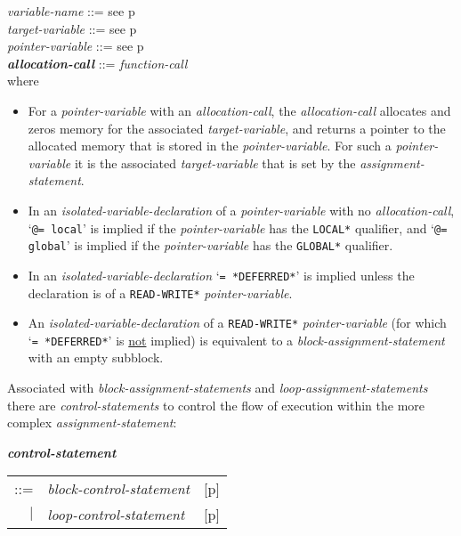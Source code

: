 \documentclass[12pt]{article}
\newcommand{\emkey}[1]{{\em \bfseries #1}}
\newcommand{\pagref}[1]{p\pageref{#1}}
\newenvironment{indpar}[1][0.3in]%
	{\begin{list}{}%
		     {\setlength{\itemsep}{0in}%
		      \setlength{\topsep}{0in}%
		      \setlength{\parsep}{1ex}%
		      \setlength{\labelwidth}{#1}%
		      \setlength{\leftmargin}{#1}%
		      \addtolength{\leftmargin}{\labelsep}}%
	 \item}%
	{\end{list}}
\begin{document}
\begin{indpar}
{\em variable-name} ::= see \pagref{VARIABLE-NAME}
\\[0.5ex]
{\em target-variable} ::= see \pagref{TARGET-VARIABLE}
\\[0.5ex]
{\em pointer-variable} ::= see \pagref{POINTER-VARIABLE}
\\[0.5ex]
\emkey{allocation-call}\label{ALLOCATION-CALL} ::= {\em function-call}
\\[2ex]
where
\begin{itemize}
\item For a {\em pointer-variable} with an {\em allocation-call},
the {\em allocation-call} allocates and zeros memory for the
associated {\em target-variable}, and returns a pointer to the
allocated memory that is stored in the {\em pointer-variable}.
For such a {\em pointer-variable} it is the
associated {\em target-variable} that is set by the {\em assignment-statement}.
\item In an {\em isolated-variable-declaration} of a
{\em pointer-variable} with no {\em allocation-call},
`{\tt @= local}' is implied if the {\em pointer-variable}
has the {\tt *LOCAL*} qualifier, and 
`{\tt @= global}' is implied if the {\em pointer-variable}
has the {\tt *GLOBAL*} qualifier.
\item In an {\em isolated-variable-declaration} `{\tt = *DEFERRED*}'
is implied unless the declaration is of a {\tt *READ-WRITE*}
{\em pointer-variable}.
\item An {\em isolated-variable-declaration} of a
{\tt *READ-WRITE*} {\em pointer-variable} (for which
`{\tt = *DEFERRED*}' is \underline{not} implied) is equivalent
to a {\em block-assignment-statement} with an empty subblock.
\end{itemize}

\end{indpar}

Associated with {\em block-assignment-statements} and
{\em loop-assignment-statements}
there are {\em con\-trol-statements}
to control the flow of execution within the more complex
{\em assignment-state\-ment}:
\begin{indpar}
\emkey{control-statement}\label{CONTROL-STATEMENT}
    \begin{tabular}[t]{@{}rll}
    ::= & {\em block-control-statement}
        & [\pagref{BLOCK-CONTROL-STATEMENT}] \\
    $|$ & {\em loop-control-statement}
        & [\pagref{LOOP-CONTROL-STATEMENT}] \\
    \end{tabular}
\end{indpar}
\end{document}
